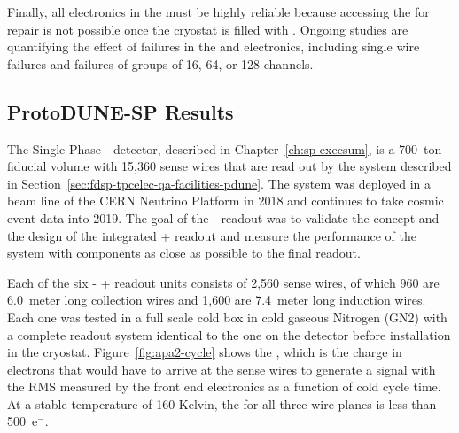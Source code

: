 Finally, all electronics in the  must 
be highly reliable because accessing the  for repair is not possible once the cryostat is filled with . Ongoing studies are quantifying the effect of failures in the  and electronics, including single wire failures and failures of groups of \num{16}, \num{64}, or \num{128} channels.


\subsection{ProtoDUNE-SP Results}
\label{sec:fdsp-tpcelec-overview-pdune}


The Single Phase - detector, described in Chapter~\ref{ch:sp-execsum}, is a 700~ton fiducial volume  with 15,360 sense wires that are read out by the  system described in Section~\ref{sec:fdsp-tpcelec-qa-facilities-pdune}. The system was deployed in a beam line of the CERN Neutrino Platform in 2018 and continues to take cosmic event data into 2019. The goal of the -  readout was to validate the concept and the design of the integrated + readout and measure the performance of the  system with components as close as possible to the final   readout.

Each of the six - + readout units consists of 2,560 sense wires, of which 960 are 6.0~meter long collection wires and 1,600 are 7.4~meter  long induction wires. Each one was tested in a full scale cold box in cold gaseous Nitrogen (GN2) with a complete  readout system identical to the one on the detector before installation in the cryostat. Figure~\ref{fig:apa2-cycle} shows the , which is the charge in electrons that would have to arrive at the sense wires to generate a signal with the RMS  measured by the front end electronics as a function of cold cycle time. At a stable temperature of 160 Kelvin,  the  for all three wire planes is less than 500~e$^-$.

